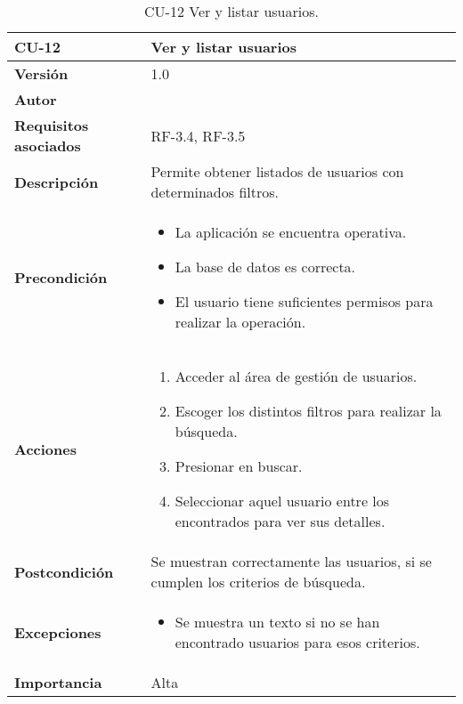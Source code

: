 \begin{table}[p]
	\centering
	\begin{tabularx}{\linewidth}{ p{} p{} }
		\toprule
		\textbf{CU-12}    & \textbf{ Ver y listar usuarios}\\
		\toprule
		\textbf{Versión}              & 1.0    \\
		\textbf{Autor}                & \@author{} \\
		\textbf{Requisitos asociados} & RF-3.4, RF-3.5\\
		\textbf{Descripción}          & Permite obtener listados de usuarios con determinados filtros. \\
		\textbf{Precondición}         &
		\begin{itemize}
			\tightlist
			\item La aplicación se encuentra operativa.
			\item La base de datos es correcta.
			\item El usuario tiene suficientes permisos para realizar la operación.
		\end{itemize}\\
		\textbf{Acciones}             &
		\begin{enumerate}
			\tightlist
			\item Acceder al área de gestión de usuarios.
			\item Escoger los distintos filtros para realizar la búsqueda.
			\item Presionar en buscar.
			\item Seleccionar aquel usuario entre los encontrados para ver sus detalles.
		\end{enumerate}\\
		\textbf{Postcondición}        & Se muestran correctamente las usuarios, si se cumplen los criterios de búsqueda.\\
		\textbf{Excepciones}          &
		\begin{itemize}
			\tightlist
			\item Se muestra un texto si no se han encontrado usuarios para esos criterios.
		\end{itemize}\\
		\textbf{Importancia}          & Alta\\
		\bottomrule
	\end{tabularx}
	\caption{CU-12 Ver y listar usuarios.}\label{tab:table-12}
\end{table}


